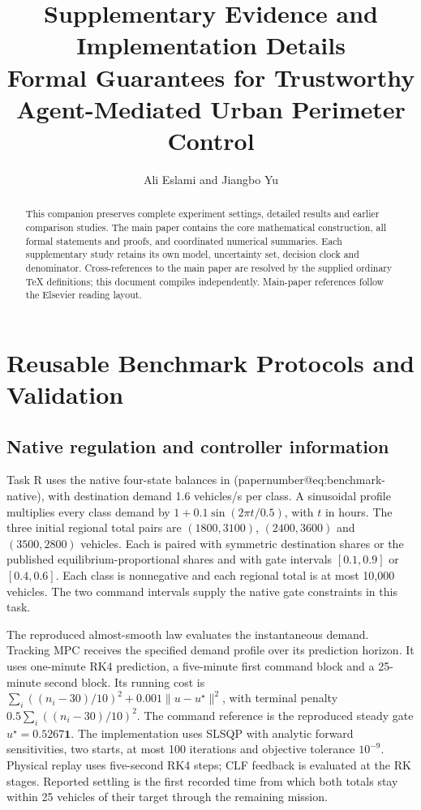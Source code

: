 \documentclass[preprint,12pt]{elsarticle}
\makeatletter
\numberwithin{equation}{section}
\newcommand{\papernumber}[1]{\csname papernumber@#1\endcsname}
\makeatother
\begin{document}
\begin{frontmatter}
\title{Supplementary Evidence and Implementation Details\\
Formal Guarantees for Trustworthy Agent-Mediated Urban Perimeter Control}
\author{Ali Eslami and Jiangbo Yu}
\begin{abstract}
This companion preserves complete experiment settings, detailed results and
earlier comparison studies. The main paper contains the core mathematical
construction, all formal statements and proofs, and coordinated numerical
summaries. Each supplementary study retains its own model, uncertainty set,
decision clock and denominator. Cross-references to the main paper are
resolved by the supplied ordinary TeX definitions; this document compiles
independently. Main-paper references follow the Elsevier reading layout.
\end{abstract}
\end{frontmatter}
\tableofcontents
\clearpage
\section{Reusable Benchmark Protocols and Validation}
\label{app:reusable-benchmark}

\subsection{Native regulation and controller information}
Task R uses the native four-state balances in
(\papernumber{eq:benchmark-native}), with destination demand 1.6 vehicles/s per
class. A sinusoidal profile multiplies every class demand by
$1+0.1\sin(2\pi t/0.5)$, with $t$ in hours. The three initial regional
total pairs are $(1800,3100)$, $(2400,3600)$ and $(3500,2800)$ vehicles.
Each is paired with symmetric destination shares or the published
equilibrium-proportional shares and with gate intervals $[0.1,0.9]$ or
$[0.4,0.6]$. Each class is nonnegative and each regional total is at
most 10,000 vehicles. The two command intervals supply the native gate
constraints in this task.

The reproduced almost-smooth law evaluates the instantaneous demand.
Tracking MPC receives the specified demand profile over its prediction
horizon. It uses one-minute RK4 prediction, a five-minute first command
block and a 25-minute second block. Its running cost is
$\sum_i((n_i-30)/10)^2+0.001\|u-u^\star\|^2$, with terminal penalty
$0.5\sum_i((n_i-30)/10)^2$. The command reference is the reproduced
steady gate $u^\star=0.5267\mathbf1$. The implementation uses SLSQP
with analytic forward sensitivities, two starts, at most 100 iterations
and objective tolerance $10^{-9}$. Physical replay uses five-second
RK4 steps; CLF feedback is evaluated at the RK stages. Reported settling
is the first recorded time from which both totals stay within 25
vehicles of their target through the remaining mission.
\end{document}
